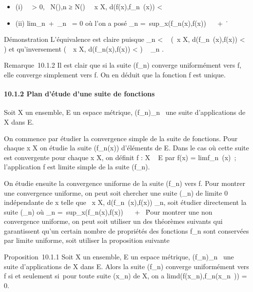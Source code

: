 \documentclass[]{article}
\begin{document}
\begin{itemize}
\itemsep1pt\parskip0pt
\item
  (i) \forall~~\epsilon \textgreater{} 0,
  \exists~N(\epsilon),\quad n ≥ N(\epsilon)
  \rigtharrow~\forall~x \in X, d(f(x),f_n~(x)) \textless{}
  \epsilon
\item
  (ii) lim_n\rightarrow~+\infty~\mu_n~ = 0 où
  l'on a posé \mu_n =\
  sup_x\inXd(f_n(x),f(x)) \in {}~ \cup\ +
  \infty~\.
\end{itemize}

Démonstration L'équivalence est claire puisque \mu_n \textless{}
\epsilon \rigtharrow~ (\forall~x \in X, d(f_n~(x),f(x))
\textless{} \epsilon) et qu'inversement (\forall~~x \in X,
d(f_n(x),f(x)) \textless{} \epsilon) \rigtharrow~ \mu_n \leq \epsilon.

Remarque~10.1.2 Il est clair que si la suite (f_n) converge
uniformément vers f, elle converge simplement vers f. On en déduit que
la fonction f est unique.

\paragraph{10.1.2 Plan d'étude d'une suite de fonctions}

Soit X un ensemble, E un espace métrique, (f_n)_n\in{}~
une suite d'applications de X dans E.

On commence par étudier la convergence simple de la suite de fonctions.
Pour chaque x \in X on étudie la suite (f_n(x)) d'éléments de E.
Dans le cas où cette suite est convergente pour chaque x \in X, on définit
f : X \rightarrow~ E par f(x) = limf_n~(x)~;
l'application f est limite simple de la suite (f_n).

On étudie ensuite la convergence uniforme de la suite (f_n)
vers f. Pour montrer une convergence uniforme, on peut soit chercher une
suite (\alpha_n) de limite 0 indépendante de x telle que
\forall~x \in X, d(f_n~(x),f(x)) \leq
\alpha_n, soit étudier directement la suite (\mu_n) où
\mu_n =\
sup_x\inXd(f_n(x),f(x)) \in {}~ \cup\ +
\infty~\. Pour montrer une non convergence uniforme, on peut
soit utiliser un des théorèmes suivants qui garantissent qu'un certain
nombre de propriétés des fonctions f_n sont conservées par
limite uniforme, soit utiliser la proposition suivante

Proposition~10.1.1 Soit X un ensemble, E un espace métrique,
(f_n)_n\in{}~ une suite d'applications de X dans E. Alors
la suite (f_n) converge uniformément vers f si et seulement
si~pour toute suite (x_n) de X, on a
limd(f(x_n),f_n(x_n~))
= 0.
\end{document}
